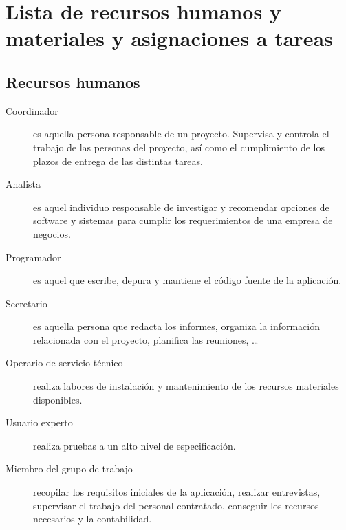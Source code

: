 \documentclass[11pt,a4paper,spanish,twoside]{book}
\begin{document}
\section{Lista de recursos humanos y materiales y asignaciones a 
  tareas}

\subsection{Recursos humanos}
\begin{description}
\item[Coordinador] es aquella persona responsable de un proyecto. Supervisa y
  controla el trabajo de las personas del proyecto, así como el cumplimiento
  de los plazos de entrega de las distintas tareas. 

\item[Analista] es aquel individuo responsable de investigar y
  recomendar opciones de software y sistemas para cumplir los requerimientos
  de una empresa de negocios.  

\item[Programador] es aquel que escribe, depura y mantiene el código fuente
  de la aplicación.  

\item[Secretario] es aquella persona que redacta los informes, organiza la
  información relacionada con el proyecto, planifica las reuniones, \dots

\item[Operario de servicio técnico] realiza labores de instalación y
  mantenimiento de los recursos materiales disponibles.

\item[Usuario experto] realiza pruebas a un alto nivel de especificación.

\item[Miembro del grupo de trabajo] recopilar los requisitos iniciales de la
  aplicación, realizar entrevistas, supervisar el trabajo del personal
  contratado, conseguir los recursos necesarios y la contabilidad.

\end{description}
\end{document}
